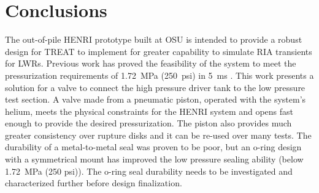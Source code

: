 \section{Conclusions} \label{s:conclusion}
The out-of-pile HENRI prototype built at OSU is intended to provide a robust design for TREAT to implement for greater capability to simulate RIA transients for LWRs.
Previous work has proved the feasibility of the system to meet the pressurization requirements of \SI{1.72}{\mega\pascal} (\SI{250}{psi}) in \SI{5}{\milli\second} \cite{HeNURETH}.
This work presents a solution for a valve to connect the high pressure driver tank to the low pressure test section.
A valve made from a pneumatic piston, operated with the system's helium, meets the physical constraints for the HENRI system and opens fast enough to provide the desired pressurization.
The piston also provides much greater consistency over rupture disks and it can be re-used over many tests.
The durability of a metal-to-metal seal was proven to be poor, but an o-ring design with a symmetrical mount has improved the low pressure sealing ability (below \SI{1.72}{\mega\pascal} (250 psi)). The o-ring seal durability needs to be investigated and characterized further before design finalization.